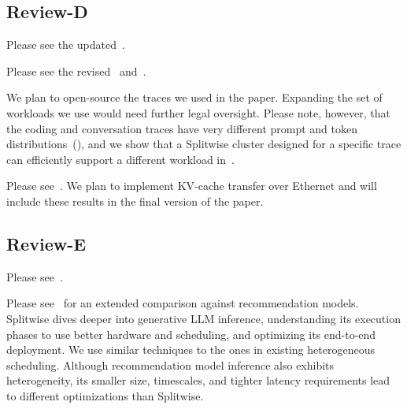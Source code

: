 \subsection{Review-D}

Please see the updated~.

Please see the revised~ and~.

We plan to open-source the traces we used in the paper. Expanding the set of workloads we use would need further legal oversight.
Please note, however, that the coding and conversation traces have very different prompt and token distributions~(), and
we show that a Splitwise cluster designed for a specific trace can efficiently support a different workload in~.

Please see~.
We plan to implement KV-cache transfer over Ethernet and will include these results in the final version of the paper.

\subsection{Review-E}
Please see~.

Please see~ for an extended comparison against recommendation models.
Splitwise dives deeper into generative LLM inference, understanding its execution phases to use better hardware and scheduling, and optimizing its end-to-end deployment.
We use similar techniques to the ones in existing heterogeneous scheduling.
Although recommendation model inference also exhibits heterogeneity, its smaller size, timescales, and tighter latency requirements lead to different optimizations than Splitwise. 

